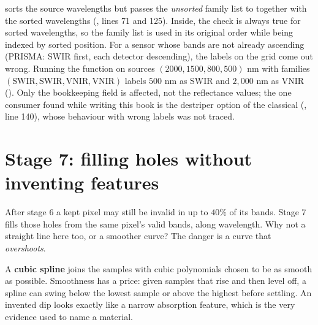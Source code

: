 \begin{sourcenote}
 sorts the source wavelengths but passes the \emph{unsorted} family
list to  together with the sorted wavelengths
(, lines 71 and 125). Inside, the check
 is always true for sorted wavelengths, so the family
list is used in its original order while being indexed by sorted position. For a sensor whose
bands are not already ascending (PRISMA: SWIR first, each detector descending), the labels on the
grid come out wrong. Running the function on sources $(2000, 1500, 800, 500)$ nm with families
$(\mathrm{SWIR}, \mathrm{SWIR}, \mathrm{VNIR}, \mathrm{VNIR})$ labels $500$ nm as SWIR and $2{,}000$
nm as VNIR ()\tagC. Only the
bookkeeping field  is affected, not the reflectance values; the one
consumer found while writing this book is the destriper option of the classical
 (, line 140), whose
behaviour with wrong labels was not traced.
\end{sourcenote}

\section{Stage 7: filling holes without inventing features}\label{sec:bandpipeline:pchip}

After stage 6 a kept pixel may still be invalid in up to $40\%$ of its bands. Stage 7 fills those
holes from the same pixel's valid bands, along wavelength. Why not a straight line here too, or a
smoother curve? The danger is a curve that \emph{overshoots}.

A \textbf{cubic spline} joins the samples with cubic polynomials chosen to be as
smooth as possible. Smoothness has a price: given samples that rise and then level off, a spline can
swing below the lowest sample or above the highest before settling. An invented dip looks exactly
like a narrow absorption feature, which is the very evidence used to name a material.

